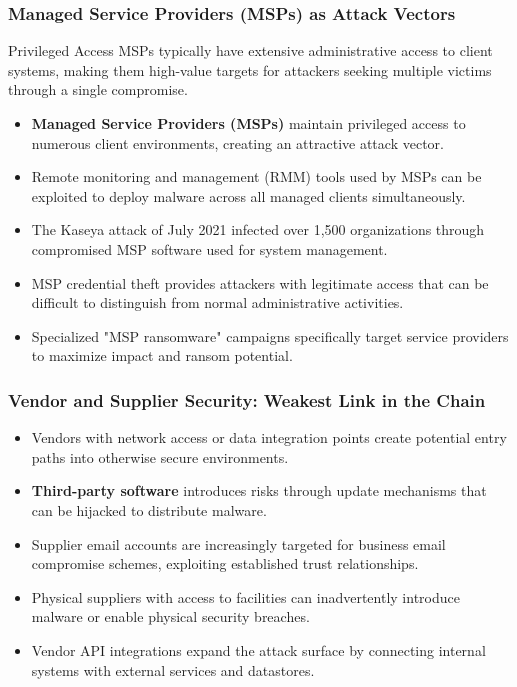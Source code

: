 \documentclass{beamer}
\begin{document}
\begin{frame}
    \frametitle{Managed Service Providers (MSPs) as Attack Vectors}
    
    \begin{alertblock}{Privileged Access}
        MSPs typically have extensive administrative access to client systems, making them high-value targets for attackers seeking multiple victims through a single compromise.
    \end{alertblock}
    
    \begin{itemize}
        \item \textbf{Managed Service Providers (MSPs)} maintain privileged access to numerous client environments, creating an attractive attack vector.
        \item Remote monitoring and management (RMM) tools used by MSPs can be exploited to deploy malware across all managed clients simultaneously.
        \item The Kaseya attack of July 2021 infected over 1,500 organizations through compromised MSP software used for system management.
        \item MSP credential theft provides attackers with legitimate access that can be difficult to distinguish from normal administrative activities.
        \item Specialized "MSP ransomware" campaigns specifically target service providers to maximize impact and ransom potential.
    \end{itemize}
\end{frame}

\begin{frame}
    \frametitle{Vendor and Supplier Security: Weakest Link in the Chain}
    
    \begin{itemize}
        \item Vendors with network access or data integration points create potential entry paths into otherwise secure environments.
        \item \textbf{Third-party software} introduces risks through update mechanisms that can be hijacked to distribute malware.
        \item Supplier email accounts are increasingly targeted for business email compromise schemes, exploiting established trust relationships.
        \item Physical suppliers with access to facilities can inadvertently introduce malware or enable physical security breaches.
        \item Vendor API integrations expand the attack surface by connecting internal systems with external services and datastores.
    \end{itemize}
\end{frame}
\end{document}
